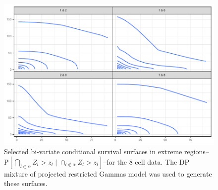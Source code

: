 \begin{figure}[h]
  \label{fig:condsurv2d}
  \includegraphics{./images/condsurv_2d}
  \caption{
    Selected bi-variate conditional survival surfaces in extreme
    regions--$\text{P}\left[\bigcap_{l \in \alpha} Z_l > z_l \mid \cap_{l\not\in\alpha} Z_l > z_l\right]$--for
    the 8 cell data.  The DP mixture of projected restricted Gammas model was used to generate these
    surfaces.
  }
\end{figure}










